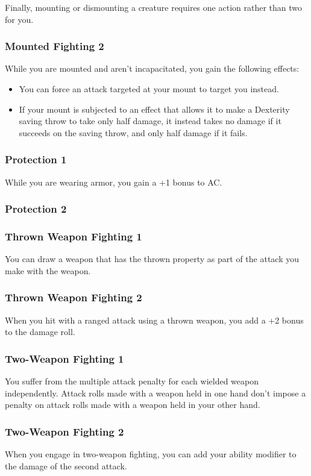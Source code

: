     Finally, mounting or dismounting a creature requires one action rather than two for you.
\subsubsection{Mounted Fighting 2}
    While you are mounted and aren't incapacitated, you gain the following effects:
    \begin{itemize}
        \item You can force an attack targeted at your mount to target you instead.
        \item If your mount is subjected to an effect that allows it to make a Dexterity saving throw to take only half damage, it instead takes no damage if it succeeds on the saving throw, and only half damage if it fails.
    \end{itemize}
\subsubsection{Protection 1}
    While you are wearing armor, you gain a +1 bonus to AC.
\subsubsection{Protection 2}
\subsubsection{Thrown Weapon Fighting 1}
    You can draw a weapon that has the thrown property as part of the attack you make with the weapon.
\subsubsection{Thrown Weapon Fighting 2}
    When you hit with a ranged attack using a thrown weapon, you add a +2 bonus to the damage roll.
\subsubsection{Two-Weapon Fighting 1}
    You suffer from the multiple attack penalty for each wielded weapon independently.
    Attack rolls made with a weapon held in one hand don't impose a penalty on attack rolls made with a weapon held in your other hand.
\subsubsection{Two-Weapon Fighting 2}
    When you engage in two-weapon fighting, you can add your ability modifier to the damage of the second attack.
